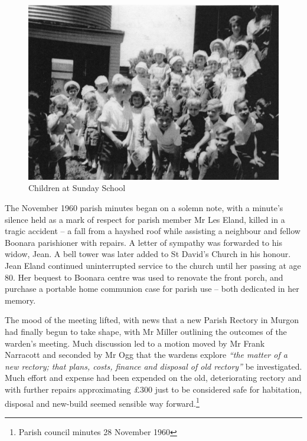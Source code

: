 \begin{figure}[!htb]
\begin{center}
\includegraphics[width=1.\textwidth,center]{../images/sundaySchoolChildren.jpg}
\caption{Children at Sunday School}
\end{center}
\end{figure}




The November 1960 parish minutes began on a solemn note, with a minute's silence held as a mark of respect for parish member Mr Les Eland, killed in a tragic accident -- a fall from a hayshed roof while assisting a neighbour and fellow Boonara parishioner with repairs. A letter of sympathy was forwarded to his widow, Jean. A bell tower was later added to St David's Church in his honour. Jean Eland continued uninterrupted service to the church until her passing at age 80. Her bequest to Boonara centre was used to renovate the front porch, and purchase a portable home communion case for parish use -- both dedicated in her memory.



The mood of the meeting lifted, with news that a new Parish Rectory in Murgon had finally begun to take shape, with Mr Miller outlining the outcomes of the warden's meeting. Much discussion led to a motion moved by Mr Frank Narracott and seconded by Mr Ogg that the wardens explore \emph{``the matter of a new rectory; that plans, costs, finance and disposal of old rectory''} be investigated. Much effort and expense had been expended on the old, deteriorating rectory and with further repairs approximating \pounds300 just to be considered safe for habitation, disposal and new-build seemed sensible way forward.\footnote{Parish council minutes 28 November 1960}


